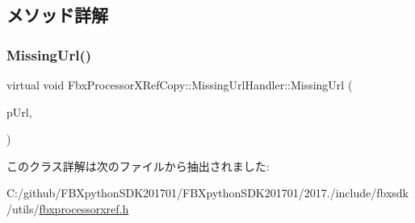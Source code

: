 \subsection{メソッド詳解}
\mbox{\label{class_fbx_processor_x_ref_copy_1_1_missing_url_handler_aa1ccc43ba9aecf2345e282e63bf722f2}} 
\subsubsection{\texorpdfstring{Missing\+Url()}{MissingUrl()}}
{\footnotesize\ttfamily virtual void Fbx\+Processor\+X\+Ref\+Copy\+::\+Missing\+Url\+Handler\+::\+Missing\+Url (\begin{DoxyParamCaption}\item[{const \hyperlink{class_fbx_string}{Fbx\+String} \&}]{p\+Url,  }\item[{const \hyperlink{class_fbx_property}{Fbx\+Property} \&}]{ }\end{DoxyParamCaption})\hspace{0.3cm}{\ttfamily [pure virtual]}}



このクラス詳解は次のファイルから抽出されました\+:\begin{DoxyCompactItemize}
\item 
C\+:/github/\+F\+B\+Xpython\+S\+D\+K201701/\+F\+B\+Xpython\+S\+D\+K201701/2017./include/fbxsdk/utils/\hyperlink{fbxprocessorxref_8h}{fbxprocessorxref.\+h}\end{DoxyCompactItemize}
